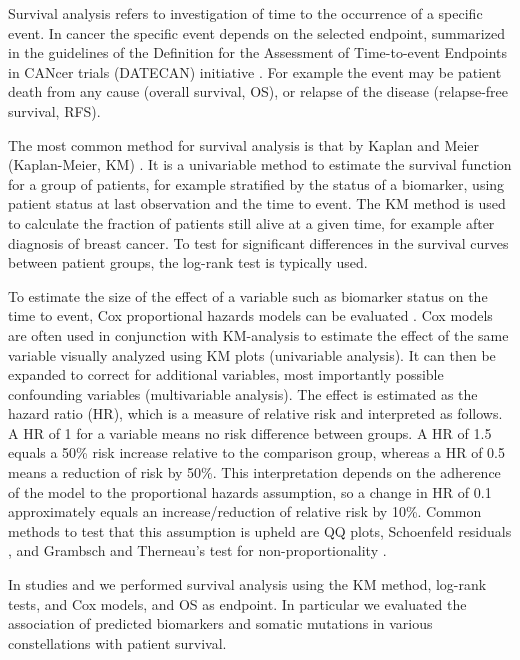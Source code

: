 \documentclass[11pt]{book}
\begin{document}
Survival analysis refers to investigation of time to the occurrence of a specific event. In cancer the specific event depends on the selected endpoint, summarized in the guidelines of the Definition for the Assessment of Time-to-event Endpoints in CANcer trials (DATECAN) initiative \cite{Gourgou-Bourgade:2015}. For example the event may be patient death from any cause (overall survival, OS), or relapse of the disease (relapse-free survival, RFS).

The most common method for survival analysis is that by Kaplan and Meier (Kaplan-Meier, KM) \cite{KaplanMeier:1958}. It is a univariable method to estimate the survival function for a group of patients, for example stratified by the status of a biomarker, using patient status at last observation and the time to event. The KM method is used to calculate the fraction of patients still alive at a given time, for example after diagnosis of breast cancer. To test for significant differences in the survival curves between patient groups, the log-rank test is typically used.

To estimate the size of the effect of a variable such as biomarker status on the time to event, Cox proportional hazards models can be evaluated \cite{Cox:1972}. Cox models are often used in conjunction with KM-analysis to estimate the effect of the same variable visually analyzed using KM plots (univariable analysis). It can then be expanded to correct for additional variables, most importantly possible confounding variables (multivariable analysis). The effect is estimated as the hazard ratio (HR), which is a measure of relative risk and interpreted as follows. A HR of 1 for a variable means no risk difference between groups. A HR of 1.5 equals a 50\% risk increase relative to the comparison group, whereas a HR of 0.5 means a reduction of risk by 50\%. This interpretation depends on the adherence of the model to the proportional hazards assumption, so a change in HR of 0.1 approximately equals an increase/reduction of relative risk by 10\%. Common methods to test that this assumption is upheld are QQ plots, Schoenfeld residuals \cite{Schoenfeld:1982}, and Grambsch and Therneau's test for non-proportionality \cite{Grambsch:1994}.

In studies \III and \IV we performed survival analysis using the KM method, log-rank tests, and Cox models, and OS as endpoint. In particular we evaluated the association of predicted biomarkers and somatic mutations in various constellations with patient survival.
\end{document}
